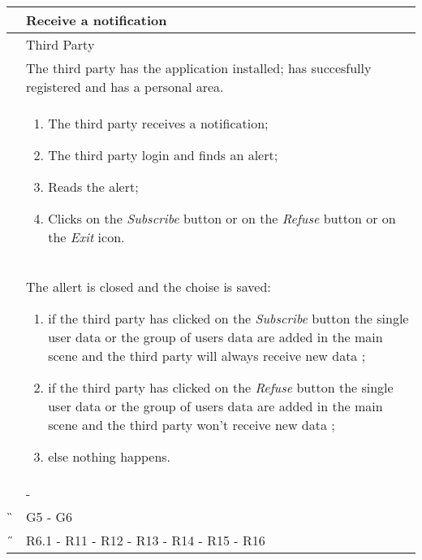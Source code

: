 \begin{center}
	\begin{longtable}{ | p{} | p{} | }
		\hline
		 \A &   Receive a notification\\ 

		\hline
		 \B &  Third Party \\ 

		\hline
  		 \C &  The third party has the application installed; has succesfully registered and has a personal area.\\ 

		\hline
		\D & \begin{enumerate}
			\item The third party receives a notification;
			\item The third party login and finds an alert;
			\item Reads the alert;
			\item Clicks on the \textit{Subscribe} button or on the \textit{Refuse} button or on the \textit{Exit} icon.
		\end{enumerate} \\

		\hline
		\E & The allert is closed and the choise is saved: \begin{enumerate}
			\item if the third party  has clicked on the \textit{Subscribe} button the single user data or the group of users data are 				added in the main scene and the third party will always receive new data ;					
			\item  if the third party  has clicked on the \textit{Refuse} button the single user data or the group of users data are 				added in the main scene and the third party won't receive new data ;	
			\item else nothing happens.
		\end{enumerate}\\

		\hline
		\F & -\\
		\hline
		\G & G5 - G6\\

		\hline
		\H & R6.1 - R11 - R12 - R13 - R14 - R15 - R16\\
		\hline

	\end{longtable}
\end{center}